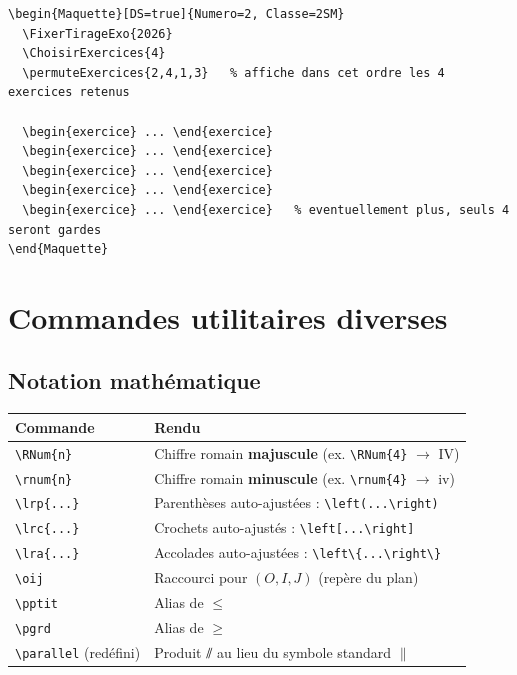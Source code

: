 \documentclass[11pt,a4paper]{article}
\newcommand{\cmdname}[1]{\texttt{\textbackslash#1}}
\begin{document}
\begin{lstlisting}
\begin{Maquette}[DS=true]{Numero=2, Classe=2SM}
  \FixerTirageExo{2026}
  \ChoisirExercices{4}
  \permuteExercices{2,4,1,3}   % affiche dans cet ordre les 4 exercices retenus

  \begin{exercice} ... \end{exercice}
  \begin{exercice} ... \end{exercice}
  \begin{exercice} ... \end{exercice}
  \begin{exercice} ... \end{exercice}
  \begin{exercice} ... \end{exercice}   % eventuellement plus, seuls 4 seront gardes
\end{Maquette}
\end{lstlisting}

\section{Commandes utilitaires diverses}

\subsection{Notation mathématique}

\begin{center}
\begin{tabular}{@{}ll@{}}
\toprule
\textbf{Commande} & \textbf{Rendu} \\
\midrule
\cmdname{RNum\{n\}} & Chiffre romain \textbf{majuscule} (ex. \texttt{\textbackslash RNum\{4\}} $\to$ IV) \\
\cmdname{rnum\{n\}} & Chiffre romain \textbf{minuscule} (ex. \texttt{\textbackslash rnum\{4\}} $\to$ iv) \\
\cmdname{lrp\{...\}} & Parenthèses auto-ajustées : \texttt{\textbackslash left(...\textbackslash right)} \\
\cmdname{lrc\{...\}} & Crochets auto-ajustés : \texttt{\textbackslash left[...\textbackslash right]} \\
\cmdname{lra\{...\}} & Accolades auto-ajustées : \texttt{\textbackslash left\textbackslash \{...\textbackslash right\textbackslash \}} \\
\cmdname{oij} & Raccourci pour $(O,I,J)$ (repère du plan) \\
\cmdname{pptit} & Alias de $\leqslant$ \\
\cmdname{pgrd} & Alias de $\geqslant$ \\
\cmdname{parallel} (redéfini) & Produit $\sslash$ au lieu du symbole standard $\parallel$ \\
\bottomrule
\end{tabular}
\end{center}
\end{document}
